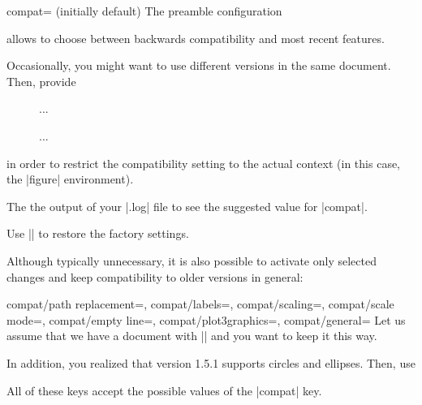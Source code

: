 \begin{pgfplotskey}{compat= (initially default)}
	The preamble configuration 
\begin{codeexample}
\usepackage{pgfplots}
\pgfplotsset{compat=1.6}
\end{codeexample}
	allows to choose between backwards compatibility and most recent features.

	Occasionally, you might want to use different versions in the same document. Then, provide
\begin{codeexample}
\begin{figure}
	\pgfplotsset{compat=1.4}
	...
	\caption{...}
\end{figure}
\end{codeexample}
	\noindent in order to restrict the compatibility setting to the actual context (in this case, the |figure| environment).

	The the output of your |.log| file to see the suggested value for |compat|.

	Use |\pgfplotsset{compat=default}| to restore the factory settings.

	Although typically unnecessary, it is also possible to activate only selected changes and keep compatibility to older versions in general:
	\begin{pgfplotskeylist}{%
		compat/path replacement=,%
		compat/labels=,%
		compat/scaling=,%
		compat/scale mode=,%
		compat/empty line=,%
		compat/plot3graphics=,%
		compat/general=%
	}
	Let us assume that we have a document with |\pgfplotsset{compat=1.3}| and you want to keep it this way.

	In addition, you realized that version 1.5.1 supports circles and ellipses. Then, use
\begin{codeexample}[]
\pgfplotsset{compat=1.3,compat/path replacement=1.5.1}
\end{codeexample}
	
	All of these keys accept the possible values of the |compat| key.


\end{pgfplotskeylist}
\end{pgfplotskey}
